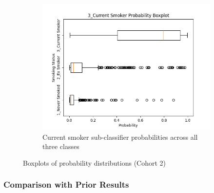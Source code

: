 \documentclass{article}
\begin{document}
\begin{figure}
    \begin{subfigure}{0.48\textwidth}
        \centering
        \includegraphics[width=\linewidth]{cohort2_3_boxplot.png}
        \caption{Current smoker sub-classifier probabilities across all three classes}
    \end{subfigure}
    \caption{Boxplots of probability distributions (Cohort 2)}
\end{figure}

\subsubsection{Comparison with Prior Results} \label{sec:model-comparison}
\end{document}
